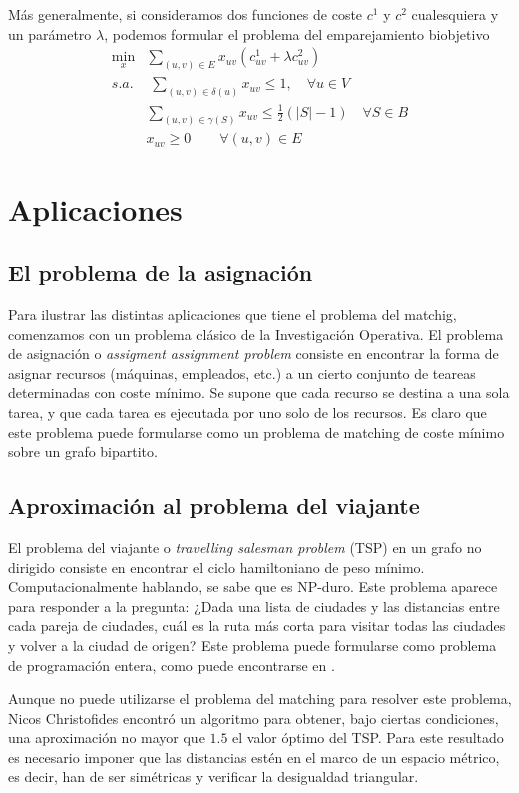 \documentclass[twoside,a4paper,openright,12pt]{book}
\begin{document}
Más generalmente, si consideramos dos funciones de coste $c^1$ y $c^2$ cualesquiera y un parámetro $\lambda$, podemos formular el problema del emparejamiento biobjetivo
\begin{align*}
\min_x & \sum_{(u,v) \in E}x_{uv}(c^1_{uv}+\lambda c^2_{uv})\\
s.a.&\;\sum_{(u,v)\in\delta(u)} x_{uv} \leq 1, \quad \forall u \in V\\
&\sum_{(u,v)\in \gamma(S)} x_{uv} \leq \frac{1}{2}(|S|-1)\quad \forall S \in B	\\
&x_{uv} \geq 0 \qquad \forall(u,v)\in E
\end{align*}
\section{Aplicaciones}
\subsection{El problema de la asignación}
Para ilustrar las distintas aplicaciones que tiene el problema del matchig, comenzamos con un problema clásico de la Investigación Operativa. El problema de asignación o \textit{assigment assignment problem} consiste en encontrar la forma de asignar recursos (máquinas, empleados, etc.) a un cierto conjunto de teareas determinadas con coste mínimo. Se supone que cada recurso se destina a una sola tarea, y que cada tarea es ejecutada por uno solo de los recursos. Es claro que este problema puede formularse como un problema de matching de coste mínimo sobre un grafo bipartito.
\subsection{Aproximación al problema del viajante}
El problema del viajante o \textit{travelling salesman problem} (TSP) en un grafo no dirigido consiste en encontrar el ciclo hamiltoniano de peso mínimo. Computacionalmente hablando, se sabe que es NP-duro. Este problema aparece para responder a la pregunta: ¿Dada una lista de ciudades y las distancias entre cada pareja de ciudades, cuál es la ruta más corta para visitar todas las ciudades y volver a la ciudad de origen? Este problema puede formularse como problema de programación entera, como puede encontrarse en \cite{papa}. 

Aunque no puede utilizarse el problema del matching para resolver este problema, Nicos Christofides encontró un algoritmo \cite{nico} para obtener, bajo ciertas condiciones, una aproximación no mayor que $1.5$ el valor óptimo del TSP. Para este resultado es necesario imponer que las distancias estén en el marco de un espacio métrico, es decir, han de ser simétricas y verificar la desigualdad triangular.
\end{document}
